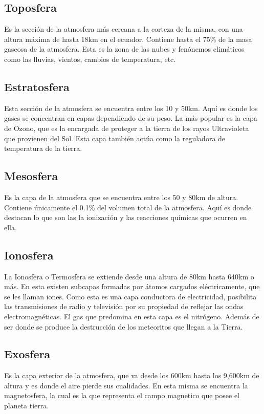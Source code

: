 \documentclass{article}
\begin{document}
\subsection{\huge Toposfera}
Es la sección de la atmosfera más cercana a la corteza de la misma, con una altura máxima de hasta 18km en el ecuador. Contiene hasta el 75\% de la masa gaseosa de la atmosfera. Esta es la zona de las nubes y fenónemos climáticos como las lluvias, vientos, cambios de temperatura, etc.\\

\subsection{\huge Estratosfera}
Esta sección de la atmosfera se encuentra entre los 10 y 50km. Aquí es donde los gases se concentran en capas dependiendo de su peso. La más popular es la capa de Ozono, que es la encargada de proteger a la tierra de los rayos Ultravioleta que provienen del Sol. Esta capa también actúa como la reguladora de temperatura de la tierra.\\

\subsection{\huge Mesosfera}
Es la capa de la atmosfera que se encuentra entre los 50 y 80km de altura. Contiene únicamente el 0.1\% del volumen total de la atmosfera. Aquí es donde destacan lo que son las la ionización y las reacciones químicas que ocurren en ella.\\

\subsection{\huge Ionosfera}
La Ionosfera o Termosfera se extiende desde una altura de 80km hasta 640km o más. En esta existen subcapas formadas por átomos cargados eléctricamente, que se les llaman iones. Como esta es una capa conductora de electricidad, posibilita las transmisiones de radio y televisión por su propiedad de reflejar las ondas electromagnéticas. El gas que predomina en esta capa es el nitrógeno. Además de ser donde se produce la destrucción de los meteoritos que llegan a la Tierra.\\

\subsection{Exosfera}
Es la capa exterior de la atmosfera, que va desde los 600km hasta los 9,600km de altura y es donde el aire pierde sus cualidades. En esta misma se encuentra la magnetosfera, la cual es la que representa el campo magnetico que posee el planeta tierra.\\
\end{document}
